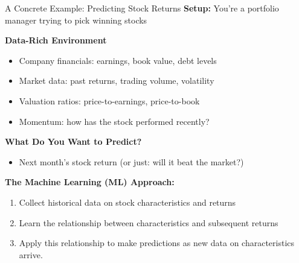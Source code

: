 \documentclass[10pt]{beamer}
\begin{document}
\begin{frame}{A Concrete Example: Predicting Stock Returns}
  \textbf{Setup:} You're a portfolio manager trying to pick winning stocks
  
  \vspace{0.5em}
  \textbf{Data-Rich Environment}
  \begin{itemize}
    \item Company financials: earnings, book value, debt levels
    \item Market data: past returns, trading volume, volatility
    \item Valuation ratios: price-to-earnings, price-to-book
    \item Momentum: how has the stock performed recently?
  \end{itemize}
  
  \vspace{0.5em}
  \textbf{What Do You Want to Predict?}
  \begin{itemize}
    \item Next month's stock return (or just: will it beat the market?)
  \end{itemize}
  
  \vspace{0.5em}
  \textbf{The Machine Learning (ML) Approach:}
  \begin{enumerate}
    \item Collect historical data on stock characteristics and returns
    \item Learn the relationship between characteristics and subsequent returns
    \item Apply this relationship to make predictions as new data on characteristics arrive. 
  \end{enumerate}
\end{frame}
\end{document}
